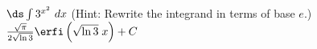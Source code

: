 {$\ds \int 3^{x^2} \ dx$ (Hint: Rewrite the integrand in terms of base $e$.)}
{$\frac{\sqrt{\pi}}{2\sqrt{\ln 3}} \erfi\left(\sqrt{\ln 3}\; x\right) +C$
}

